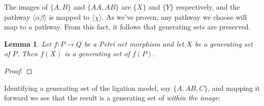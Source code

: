 \documentclass[aps,prd,onecolumn,nofootinbib,letterpaper,preprintnumbers,superscriptaddress,eqsecnum]{revtex4}
\newtheorem{lemma}{Lemma}
\theoremstyle{definition}
\newcommand{\pathway}[1]{\langle#1\rangle}
\newcommand{\red}[1]{{\color{red}#1}}
\newcommand{\TODO}[1]{\noindent\red{\textbf{TODO:}~#1}}
\begin{document}
The images of $\{A,B\}$ and $\{AA,AB\}$ are $\{X\}$ and $\{Y\}$ respectively, and the pathway $\pathway{\alpha\beta}$ is mapped to $\pathway{\chi}$.
As we've proven, any pathway we choose will map to a pathway.
From this fact, it follows that generating sets are preserved.
\begin{lemma}\label{lem:image-of-generating-sets}
    Let $f: P \rightarrow Q$ be a Petri net morphism and let $X$ be a generating set of $P$.
    Then $f(X)$ is a generating set of $f(P)$.
\end{lemma}
\begin{proof}
    \TODO{Complete}
\end{proof}
Identifying a generating set of the ligation model, say $\{A, AB, C\}$, and mapping it forward we see that the result is a generating set of \textit{within the image}:
\begin{center}
\end{center}
\end{document}
